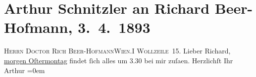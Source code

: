 

         
         \renewcommand{\erwaehntePersonen}{Personen: Richard Beer-Hofmann}
         \renewcommand{\erwaehnteOrte}{Orte: Wien, Wollzeile}
         \renewcommand{\erwaehnteWerke}{}
               \section[Arthur Schnitzler an Richard Beer-Hofmann, 3. 4. 1893]{ Arthur Schnitzler an Richard Beer-Hofmann, 3. 4. 1893}\nopagebreak{}\rehead{ }\begin{ledgroupsized}[t]{13cm}\normalsize\beginnumbering{} \toendnotes[C]{\smallbreak\pagebreak[2]} 
\pstart{}{\pb}\textsc{Herrn Doctor Rich Beer-Hofmann}\pend{}\pstart{}\textsc{Wien.}\pend{}\pstart{}\textsc{I Wollzeile 15}.\pend{}{\bigskip}\pstart
           \noindent{}{\pb}Lieber Richard, \uline{morgen Oſtermontag} findet ſich alles um 3.30 bei mir zuſa{\geminationm}en.\pend
           \pstart
           Herzlichſt Ihr{\\[\baselineskip]}\spacefill\mbox{Arthur}\pend
           \leftskip=0em{}
         
         \endnumbering{}\end{ledgroupsized}  \newcommand{\dateiname}{L00195}\newcommand{\titel}{Arthur Schnitzler an Richard Beer-Hofmann, 3. 4. 1893}\newcommand{\editorInnen}{Martin Anton Müller und Gerd-Hermann Susen}
      